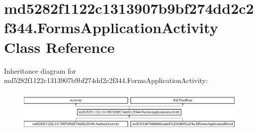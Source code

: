 \hypertarget{classmd5282f1122c1313907b9bf274dd2c2f344_1_1FormsApplicationActivity}{}\section{md5282f1122c1313907b9bf274dd2c2f344.\+Forms\+Application\+Activity Class Reference}
\label{classmd5282f1122c1313907b9bf274dd2c2f344_1_1FormsApplicationActivity}
Inheritance diagram for md5282f1122c1313907b9bf274dd2c2f344.\+Forms\+Application\+Activity\+:\begin{figure}[H]
\begin{center}
\leavevmode
\includegraphics[height=2.068965cm]{classmd5282f1122c1313907b9bf274dd2c2f344_1_1FormsApplicationActivity}
\end{center}
\end{figure}
